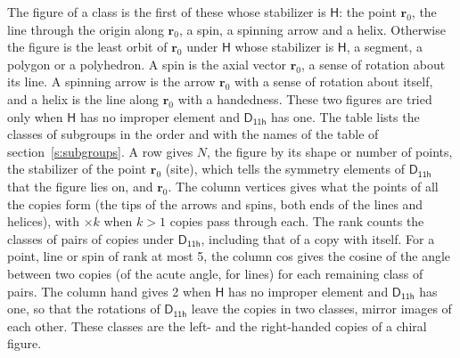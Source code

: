 \documentclass[10pt,a4paper]{article}
\numberwithin{equation}{section}
\newcommand{\grp}[1]{\mathsf{#1}}
\newcommand{\pointr}{\mathbf{r}}
\begin{document}
\leavevmode\label{n:head.figure}The figure of a class is the first of these whose stabilizer is $\grp{H}$: the point $\pointr_0$, the line through the origin along $\pointr_0$, a spin, a spinning arrow and a helix. Otherwise the figure is the least orbit of $\pointr_0$ under $\grp{H}$ whose stabilizer is $\grp{H}$, a segment, a polygon or a polyhedron. A spin is the axial vector $\pointr_0$, a sense of rotation about its line. A spinning arrow is the arrow $\pointr_0$ with a sense of rotation about itself, and a helix is the line along $\pointr_0$ with a handedness. These two figures are tried only when $\grp{H}$ has no improper element and $\grp{D_{11h}}$ has one. The table lists the classes of subgroups in the order and with the names of the table of section~\ref{s:subgroups}. \label{n:head.site}A row gives $N$, the figure by its shape or number of points, the stabilizer of the point $\pointr_0$ (site), which tells the symmetry elements of $\grp{D_{11h}}$ that the figure lies on, and $\pointr_0$. \label{n:head.vertices}The column vertices gives what the points of all the copies form (the tips of the arrows and spins, both ends of the lines and helices), with ${\times}k$ when $k > 1$ copies pass through each. \label{n:head.rank}The rank counts the classes of pairs of copies under $\grp{D_{11h}}$, including that of a copy with itself. \label{n:head.cos}For a point, line or spin of rank at most 5, the column cos gives the cosine of the angle between two copies (of the acute angle, for lines) for each remaining class of pairs. \label{n:head.hand}The column hand gives 2 when $\grp{H}$ has no improper element and $\grp{D_{11h}}$ has one, so that the rotations of $\grp{D_{11h}}$ leave the copies in two classes, mirror images of each other. These classes are the left- and the right-handed copies of a chiral figure.
\end{document}
